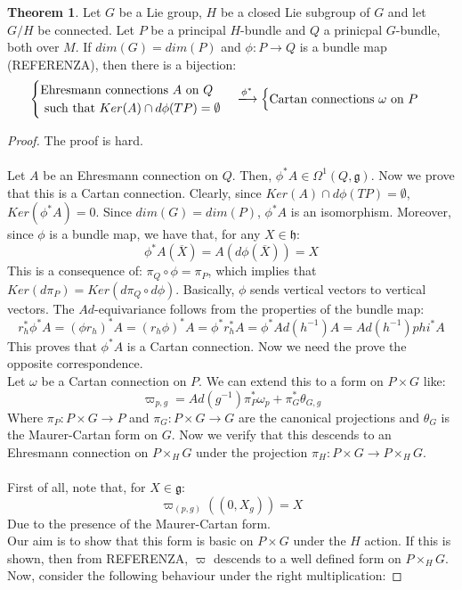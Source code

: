 \documentclass[12pt,a4paper]{report}
\theoremstyle{definition}
\theoremstyle{Theorem}
\newtheorem{Theo}[Def]{Theorem}
\theoremstyle{definition}
\theoremstyle{definition}
\begin{document}
	\begin{Theo}
		Let $G$ be a Lie group, $H$ be a closed Lie subgroup of $G$ and let $G/H$ be connected. Let $P$ be a principal $H$-bundle and $Q$ a prinicpal $G$-bundle, both over $M$. If $dim(G)=dim(P)$ and $\phi:P\rightarrow  Q$ is a bundle map (REFERENZA), then there is a bijection:
		$$\begin{cases}
			\hbox{Ehresmann connections } A \hbox{ on } Q \\ \hbox{ such that } Ker(A)\cap d\phi(TP)=\emptyset
		\end{cases}\xlongrightarrow{\phi^*} \begin{cases}
		\hbox{Cartan connections } \omega \hbox{ on } P
		\end{cases}$$
	\end{Theo}
	\begin{proof}
		The proof is hard.\\
		\\
		Let $A$ be an Ehresmann connection on $Q$. Then, $\phi^*A\in\Omega^1(Q,\mathfrak{g})$. Now we prove that this is a Cartan connection. Clearly, since $Ker(A)\cap d\phi(TP)=\emptyset$, $Ker(\phi^*A)=0$. Since $dim(G)=dim(P)$, $\phi^*A$ is an isomorphism. Moreover, since $\phi$ is a bundle map, we have that, for any $X\in\mathfrak{h}$:
		$$\phi^*A(\overline{X})=A(d\phi(\overline{X}))=X$$
		This is a consequence of: $\pi_Q\circ\phi=\pi_P$, which implies that $Ker(d\pi_P)=Ker(d\pi_Q\circ d\phi)$. Basically, $\phi$ sends vertical vectors to vertical vectors. The $Ad$-equivariance follows from the properties of the bundle map:
		$$r_h^*\phi^*A=(\phi r_h)^*A=( r_h\phi)^*A=\phi^*r_h^*A=\phi^*Ad(h^{-1})A=Ad(h^{-1})phi^*A$$
		This proves that $\phi^*A$ is a Cartan connection. Now we need the prove the opposite correspondence.
		\\
		Let $\omega$ be a Cartan connection on $P$. We can extend this to a form on $P\times G$ like:
		$$\varpi_{p,g}=Ad(g^{-1})\pi^*_P\omega_p+\pi^*_G\theta_{G,g}$$
		Where $\pi_P:P\times G\rightarrow P$ and $\pi_G:P\times G\rightarrow G$ are the canonical projections and $\theta_G$ is the Maurer-Cartan form on $G$. Now we verify that this descends to an Ehresmann connection on $P\times_H G$ under the projection $\pi_H:P\times G\rightarrow P\times_H G$.
		\\\\ 
		First of all, note that, for $X\in\mathfrak{g}$:
		$$\varpi_{(p,g)}((0,X_g))=X$$
		Due to the presence of the Maurer-Cartan form.\\
		Our aim is to show that this form is basic on $P\times G$ under the $H$ action. If this is shown, then from REFERENZA, $\varpi$ descends to a well defined form on $P\times_H G$. Now, consider the following behaviour under the right multiplication:

\end{proof}
\end{document}
